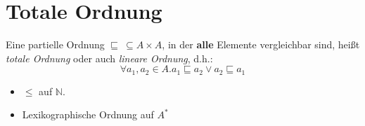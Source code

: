 \documentclass{article}
\begin{document}
\section*{Totale Ordnung}
\begin{defBox}
	Eine partielle Ordnung $\sqsubseteq\ \subseteq A \times A$,
	in der \textbf{alle} Elemente vergleichbar sind,
	heißt \textit{totale Ordnung} oder auch \textit{lineare Ordnung}, d.h.:
	\[
		\forall a_1, a_2 \in A. a_1 \sqsubseteq a_2 \lor a_2 \sqsubseteq a_1
	\]
\end{defBox}
\begin{exampleBox}
	\begin{itemize}[label=]
		\item $\leq$ auf $\mathbb{N}$.
		\item Lexikographische Ordnung auf $A^{*}$
	\end{itemize}
\end{exampleBox}
\end{document}
